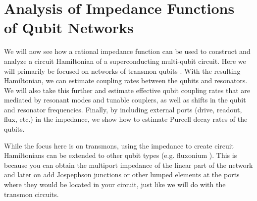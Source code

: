 \newcommand{\opa}{\hat{a}^{\phantom{\dagger}}}
\newcommand{\opb}{\hat{b}^{\phantom{\dagger}}}
\newcommand{\opad}{\hat{a}^{\dagger}}
\newcommand{\opbd}{\hat{b}^{\dagger}}

\chapter[Analysis of Impedance Functions of Qubit Networks]{Analysis of Impedance Functions\\ of Qubit Networks}
\label{chapter:analysis_impedance}

We will now see how a rational impedance function can be used to construct and analyze a circuit Hamiltonian of a superconducting multi-qubit circuit. Here we will primarily be focused on networks of transmon qubits \cite{transmon}. With the resulting Hamiltonian, we can estimate coupling rates between the qubits and resonators. We will also take this further and estimate effective qubit coupling rates that are mediated by resonant modes and tunable couplers, as well as shifts in the qubit and resonator frequencies. Finally, by including external ports (drive, readout, flux, etc.) in the impedance, we show how to estimate Purcell decay rates of the qubits.

While the focus here is on transmons, using the impedance to create circuit Hamiltonians can be extended to other qubit types (e.g. fluxonium \cite{fluxonium}). This is because you can obtain the multiport impedance of the linear part of the network and later on add Jospephson junctions or other lumped elements at the ports where they would be located in your circuit, just like we will do with the transmon circuits.




